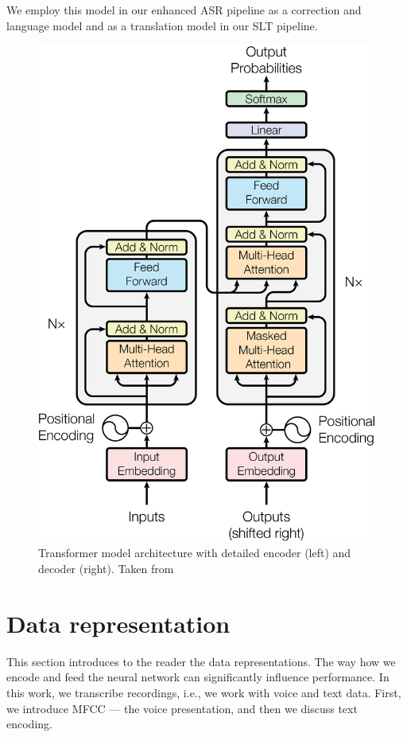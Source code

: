 We employ this model in our enhanced ASR pipeline as a correction and language model and as a translation model in our SLT pipeline. 

\begin{figure}[h]
	\centering
	\includegraphics[width=0.8\linewidth]{img/ModalNet-21.png}
	\caption{Transformer model architecture with detailed encoder (left) and decoder (right). Taken from }
	\label{fig:transformer}
\end{figure}





\pagebreak
\section{Data representation}
This section introduces to the reader the data representations. The way how we encode and feed the neural network can significantly influence performance. In this work, we transcribe recordings, i.e., we work with voice and text data. First, we introduce MFCC --- the voice presentation, and then we discuss text encoding.

